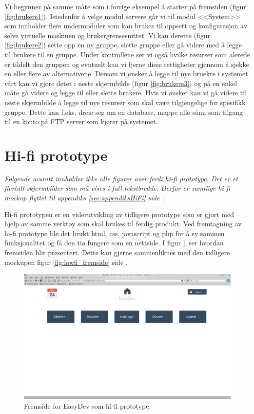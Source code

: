 Vi begynner på samme måte som i forrige eksempel å starter på fremsiden (figur \ref{fig:brukere1}). Istedenfor å velge modul servere går vi til modul <<System>> som innholder flere undermoduler som kan brukes til oppsett og konfigurasjon av selve virtuelle maskinen og brukergrensesnittet. 
Vi kan derette (figur \ref{fig:brukere2}) sette opp en ny gruppe, slette gruppe eller gå videre med å legge til brukere til en gruppe. Under kontrollene ser vi også hvilke resurser som alerede er tildelt den gruppen og evntuelt kan vi fjerne disse rettigheter gjennom å sjekke en eller flere av alternativene.
Dersom vi ønsker å legge til nye bruekre i systemet vårt kan vi gjøre detet i neste skjermbilde (figur \ref{fig:brukere3}) og på en enkel måte gå videre og legge til eller slette brukere.
Hvis vi ønsker kan vi gå videre til neste skjermbilde å legge til nye resurser som skal være tilgjengelige for spesifikk gruppe. Dette kan f.eks. dreie seg om en database, mappe alle sånn som tilgang til en konto på FTP server som kjører på systemet. 

\section{Hi-fi prototype}
\emph{Følgende avsnitt innholder ikke alle figurer over ferdi hi-fi prototype. Det er et flertall skjermbilder som må vises i full tekstbredde. Derfor er samtlige hi-fi mockup flyttet til appendiks \ref{sec:appendiksHiFi} side \pageref{sec:appendiksHiFi}.}

Hi-fi prototypen er en viderutvikling av tidligere prototype som er gjort med hjelp av samme verktøy som skal brukes til ferdig produkt. Ved fremtagning av hi-fi prototype ble det brukt  html, css, javascript og php for å sy sammen funksjonalitet og få den tiø fungere som en nettside. I figur \ref{fig:hifi_fremside} ser hvordan fremsiden blir presentert. Dette kan gjerne sammenliknes med den tidligere mockupen figur \ref{fig:lowfi_fremside} side \pageref{fig:lowfi_fremside}.
\begin{figure}[ht]
\includegraphics[width=\textwidth,height=\textheight,keepaspectratio]{./img/prosessdokumentasjon/hifi/fremside.png}
\caption[Hi-fi prototype]{Fremside for EasyDev som hi-fi prototype.}
\label{fig:hifi_fremside}
\end{figure}

